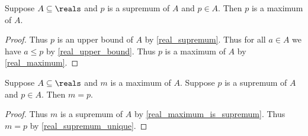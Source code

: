 \begin{theorem}\label{real_supremum_in_set_is_maximum}
    Suppose $A\subseteq\reals$ and $p$ is a supremum of $A$ and $p\in A$.
    Then $p$ is a maximum of $A$.
\end{theorem}
\begin{proof}
    Thus $p$ is an upper bound of $A$ by \cref{real_supremum}.
    Thus for all $a\in A$ we have $a \leq p$ by \cref{real_upper_bound}.
    Thus $p$ is a maximum of $A$ by \cref{real_maximum}.
\end{proof}

\begin{theorem}\label{real_maximum_eq_supremum}
    Suppose $A\subseteq\reals$ and $m$ is a maximum of $A$.
    Suppose $p$ is a supremum of $A$ and $p\in A$.
    Then $m = p$.
\end{theorem}
\begin{proof}
    Thus $m$ is a supremum of $A$ by \cref{real_maximum_is_supremum}.
    Thus $m = p$ by \cref{real_supremum_unique}.
\end{proof}

